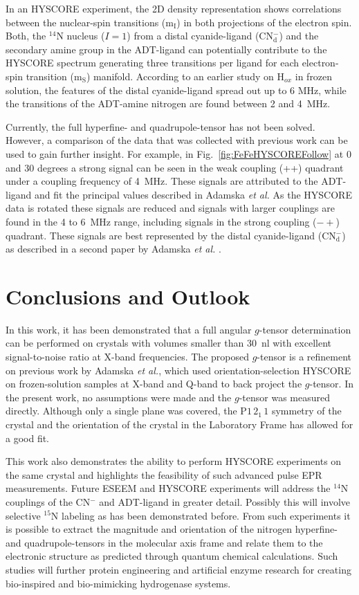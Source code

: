 In an HYSCORE experiment, the 2D density representation shows correlations between the nuclear-spin transitions (m$_\text{I}$) in both projections of the electron spin. Both, the $^{14}$N nucleus ($I=1$) from a distal cyanide-ligand (CN$_\text{d}^-$) and the secondary amine group in the ADT-ligand can potentially contribute to the HYSCORE spectrum generating three transitions per ligand for each electron-spin transition (m$_\text{S}$) manifold. According to an earlier study on H$_{ox}$ in frozen solution, the features of the distal cyanide-ligand spread out up to 6 MHz, while the transitions of the ADT-amine nitrogen are found between 2 and 4~MHz. \cite{Adamska2015,Adamska2015pdt}

Currently, the full hyperfine- and quadrupole-tensor has not been solved. However, a comparison of the data that was collected with previous work can be used to gain further insight. For example, in Fig.~\ref{fig:FeFeHYSCOREFollow} at 0 and 30 degrees a strong signal can be seen in the weak coupling (++) quadrant under a coupling frequency of 4~MHz. These signals are attributed to the ADT-ligand and fit the principal values described in Adamska \textit{ et al.} \cite{Adamska2015pdt} As the HYSCORE data is rotated these signals are reduced and signals with larger couplings are found in the 4 to 6~MHz range, including signals in the strong coupling ($-+$) quadrant. These signals are best represented by the distal cyanide-ligand (CN$_\text{d}^-$) as described in a second paper by Adamska\textit{ et al.} \cite{Adamska2015}. 

\section{Conclusions and Outlook}
In this work, it has been demonstrated that a full angular $g$-tensor determination can be performed on crystals with volumes smaller than 30~nl with excellent signal-to-noise ratio at X-band frequencies. The proposed $g$-tensor is a refinement on previous work by Adamska \textit{et al.}, which used orientation-selection HYSCORE on frozen-solution samples at X-band and Q-band to back project the $g$-tensor. In the present work, no assumptions were made and the $g$-tensor was measured directly. Although only a single plane was covered, the P$1\,2_1\,1$ symmetry of the crystal and the orientation of the crystal in the Laboratory Frame has allowed for a good fit. 

This work also demonstrates the ability to perform HYSCORE experiments on the same crystal and highlights the feasibility of such advanced pulse EPR measurements. Future ESEEM and HYSCORE experiments will address the $^{14}$N couplings of the CN$^-$ and ADT-ligand in greater detail. Possibly this will involve selective $^{15}$N labeling as has been demonstrated before. \cite{Adamska2015,AdamskaBridgingAmine} From such experiments it is possible to extract the magnitude and orientation of the nitrogen hyperfine- and quadrupole-tensors in the molecular axis frame and relate them to the electronic structure as predicted through quantum chemical calculations. Such studies will further protein engineering and artificial enzyme research for creating bio-inspired and bio-mimicking hydrogenase systems. \cite{C7SE00582B}

